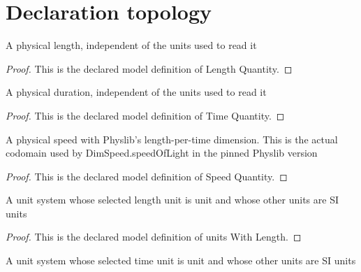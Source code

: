 \section{Declaration topology}
\begin{definition}
  \label{def:physics:phyx-mini-0727:phyxminiproblems-problemphyxmini0727-lengthquantity}
  A physical length, independent of the units used to read it
\end{definition}
\begin{proof}
  This is the declared model definition of Length Quantity.
\end{proof}
\begin{definition}
  \label{def:physics:phyx-mini-0727:phyxminiproblems-problemphyxmini0727-timequantity}
  A physical duration, independent of the units used to read it
\end{definition}
\begin{proof}
  This is the declared model definition of Time Quantity.
\end{proof}
\begin{definition}
  \label{def:physics:phyx-mini-0727:phyxminiproblems-problemphyxmini0727-speedquantity}
  A physical speed with Physlib's length-per-time dimension. This is the actual codomain used by DimSpeed.speedOfLight in the pinned Physlib version
\end{definition}
\begin{proof}
  This is the declared model definition of Speed Quantity.
\end{proof}
\begin{definition}
  \label{def:physics:phyx-mini-0727:phyxminiproblems-problemphyxmini0727-unitswithlength}
  A unit system whose selected length unit is unit and whose other units are SI units
\end{definition}
\begin{proof}
  This is the declared model definition of units With Length.
\end{proof}
\begin{definition}
  \label{def:physics:phyx-mini-0727:phyxminiproblems-problemphyxmini0727-unitswithtime}
  A unit system whose selected time unit is unit and whose other units are SI units
\end{definition}

